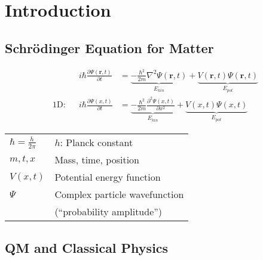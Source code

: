 \section{Introduction}

\subsection{Schrödinger Equation for Matter}
\begin{align*}
               &  & i\hbar \frac{\partial \Psi(\mathbf{r},t)}{\partial t} & = \underbrace{- \frac{\hbar^2}{2m} \nabla^2 \Psi(\mathbf{r},t)}_{E_{kin}} + \underbrace{V(\mathbf{r},t)\Psi(\mathbf{r},t)}_{E_{pot}} \\
    \text{1D:} &  & i\hbar \frac{\partial \Psi(x,t)}{\partial t}          & = \underbrace{- \frac{\hbar^2}{2m} \frac{\partial^2 \Psi(x,t)}{\partial x^2}}_{E_{kin}} + \underbrace{V(x,t)\Psi(x,t)}_{E_{pot}}
\end{align*}

\renewcommand{\arraystretch}{1.3}
\setlength\tabcolsep{6pt} %
\begin{tabularx}{\linewidth}{@{}ll@{}}
    $\hbar = \frac{h}{2\pi}$ & $h$: Planck constant          \\
    $m,t,x$                  & Mass, time, position          \\
    $V(x,t)$                 & Potential energy function     \\
    $\Psi$                   & Complex particle wavefunction \\
                             & (``probability amplitude'')     \\
\end{tabularx}
\renewcommand{\arraystretch}{1}
\setlength\tabcolsep{6pt} %
\subsection{QM and Classical Physics}
